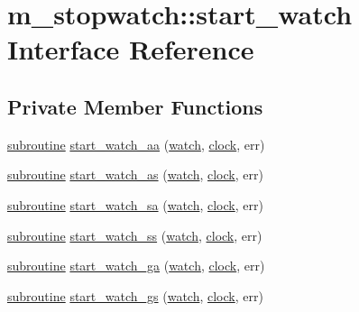 \hypertarget{interfacem__stopwatch_1_1start__watch}{}\section{m\+\_\+stopwatch\+:\+:start\+\_\+watch Interface Reference}
\label{interfacem__stopwatch_1_1start__watch}
\subsection*{Private Member Functions}
\begin{DoxyCompactItemize}
\item 
\hyperlink{M__stopwatch_83_8txt_acfbcff50169d691ff02d4a123ed70482}{subroutine} \hyperlink{interfacem__stopwatch_1_1start__watch_abb96a8ce730416c708a45b57a7f12051}{start\+\_\+watch\+\_\+aa} (\hyperlink{read__watch_83_8txt_ad2129669fa47b8899641309620add095}{watch}, \hyperlink{stop__watch_83_8txt_a148c035b430d6edf5413dbd2704facfb}{clock}, err)
\item 
\hyperlink{M__stopwatch_83_8txt_acfbcff50169d691ff02d4a123ed70482}{subroutine} \hyperlink{interfacem__stopwatch_1_1start__watch_a19b66cdb356d70bdf5581f1532d19c80}{start\+\_\+watch\+\_\+as} (\hyperlink{read__watch_83_8txt_ad2129669fa47b8899641309620add095}{watch}, \hyperlink{stop__watch_83_8txt_a148c035b430d6edf5413dbd2704facfb}{clock}, err)
\item 
\hyperlink{M__stopwatch_83_8txt_acfbcff50169d691ff02d4a123ed70482}{subroutine} \hyperlink{interfacem__stopwatch_1_1start__watch_a6f734d2194c208f4724345f3ed6b71d9}{start\+\_\+watch\+\_\+sa} (\hyperlink{read__watch_83_8txt_ad2129669fa47b8899641309620add095}{watch}, \hyperlink{stop__watch_83_8txt_a148c035b430d6edf5413dbd2704facfb}{clock}, err)
\item 
\hyperlink{M__stopwatch_83_8txt_acfbcff50169d691ff02d4a123ed70482}{subroutine} \hyperlink{interfacem__stopwatch_1_1start__watch_adce067869bbe353d88dff743f81308d1}{start\+\_\+watch\+\_\+ss} (\hyperlink{read__watch_83_8txt_ad2129669fa47b8899641309620add095}{watch}, \hyperlink{stop__watch_83_8txt_a148c035b430d6edf5413dbd2704facfb}{clock}, err)
\item 
\hyperlink{M__stopwatch_83_8txt_acfbcff50169d691ff02d4a123ed70482}{subroutine} \hyperlink{interfacem__stopwatch_1_1start__watch_ae147538e6da5f0485b4b253baafebd3e}{start\+\_\+watch\+\_\+ga} (\hyperlink{read__watch_83_8txt_ad2129669fa47b8899641309620add095}{watch}, \hyperlink{stop__watch_83_8txt_a148c035b430d6edf5413dbd2704facfb}{clock}, err)
\item 
\hyperlink{M__stopwatch_83_8txt_acfbcff50169d691ff02d4a123ed70482}{subroutine} \hyperlink{interfacem__stopwatch_1_1start__watch_a6422282abb8ddbd1412cc282988b1b6d}{start\+\_\+watch\+\_\+gs} (\hyperlink{read__watch_83_8txt_ad2129669fa47b8899641309620add095}{watch}, \hyperlink{stop__watch_83_8txt_a148c035b430d6edf5413dbd2704facfb}{clock}, err)
\end{DoxyCompactItemize}


